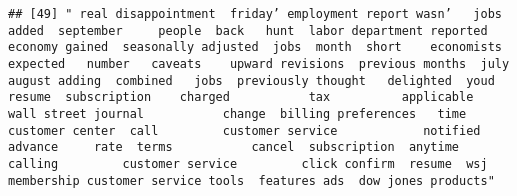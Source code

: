 \documentclass[
]{article}
\begin{document}
\begin{verbatim}
## [49] " real disappointment  friday’ employment report wasn’   jobs  added  september     people  back   hunt  labor department reported   economy gained  seasonally adjusted  jobs  month  short    economists  expected   number   caveats    upward revisions  previous months  july  august adding  combined   jobs  previously thought   delighted  youd   resume  subscription    charged           tax          applicable   wall street journal           change  billing preferences   time   customer center  call         customer service            notified  advance     rate  terms           cancel  subscription  anytime  calling         customer service         click confirm  resume  wsj membership customer service tools  features ads  dow jones products"                                                                                                                                                                                                                                                                                                                                                                                                                                                                                                                                                                                                                                                                                                                                                                                                                                                                                                                                                                                                                                                                                                                                                                                                                                                                                                                                                                                                                                                                                                                                                                                                                                                                                                                                                                                                                                                                                                                                                                                                                                                                                                                                                                                                                                                                                                                                                                                                                                                                                                                                                                                                                                                                
\end{verbatim}
\end{document}
